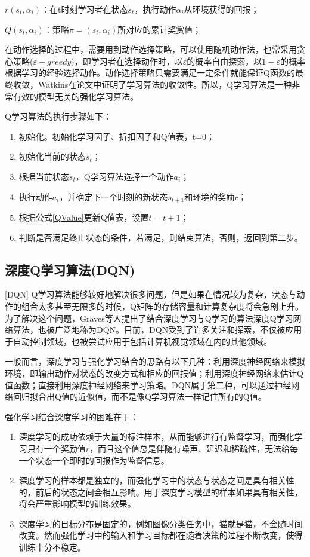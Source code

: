 $r(s_t,\alpha_i)$：在t时刻学习者在状态$s_t$，执行动作$\alpha_i$从环境获得的回报；

$Q(s_t,\alpha_i)$：策略$\pi=(s_t,\alpha_i)$所对应的累计奖赏值；

在动作选择的过程中，需要用到动作选择策略，可以使用随机动作法，也常采用贪心策略($\varepsilon-greedy$)，即学习者在选择动作时，以$\varepsilon$的概率自由探索，以$1-\varepsilon$的概率根据学习的经验选择动作。动作选择策略只需要满足一定条件就能保证Q函数的最终收敛，Watkins在论文\cite{QLearning3}中证明了学习算法的收敛性。所以，Q学习算法是一种非常有效的模型无关的强化学习算法。

Q学习算法的执行步骤如下：
\begin{enumerate}
    \item 初始化。初始化学习因子、折扣因子和Q值表，t=0；
    \item 初始化当前的状态$s_t$；
    \item 根据当前状态$s_t$，Q学习算法选择一个动作$a_i$；
    \item 执行动作$a_i$，并确定下一个时刻的新状态$s_{t+1}$和环境的奖励$r$；
    \item 根据公式\ref{QValue}更新Q值表，设置$t = t+1$；
    \item 判断是否满足终止状态的条件，若满足，则结束算法，否则，返回到第二步。
\end{enumerate}

\subsection{深度Q学习算法(DQN)}[DQN]
Q学习算法能够较好地解决很多问题，但是如果在情况较为复杂，状态与动作的组合太多甚至无限多的时候，Q矩阵的存储容量和计算复杂度将会急剧上升。为了解决这个问题，Graves等人提出了结合深度学习与Q学习的算法深度Q学习网络算法\cite{DQNNature}，也被广泛地称为DQN。目前，DQN受到了许多关注和探索，不仅被应用于自动控制领域，也被尝试应用于包括计算机视觉领域在内的其他领域。

一般而言，深度学习与强化学习结合的思路有以下几种：利用深度神经网络来模拟环境，即输出动作对状态的改变方式和相应的回报值；利用深度神经网络来估计Q值函数；直接利用深度神经网络来学习策略。DQN属于第二种，可以通过神经网络回归拟合出Q值的近似值，而不是像Q学习算法一样记住所有的Q值。

强化学习结合深度学习的困难在于：
\begin{enumerate}    
    \item 深度学习的成功依赖于大量的标注样本，从而能够进行有监督学习，而强化学习只有一个奖励值$r$，而且这个值总是伴随有噪声、延迟和稀疏性，无法给每一个状态一个即时的回报作为监督信息。
    \item 深度学习的样本都是独立的，而强化学习中的状态与状态之间是具有相关性的，前后的状态之间会相互影响。用于深度学习模型的样本如果具有相关性，将会严重影响模型的训练效果。
    \item 深度学习的目标分布是固定的，例如图像分类任务中，猫就是猫，不会随时间改变。然而强化学习中的输入和学习目标都在随着决策的过程不断改变，使得训练十分不稳定。
\end{enumerate}

